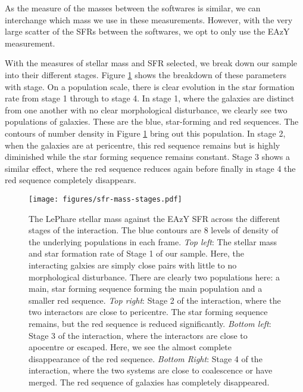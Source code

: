 \documentclass[fleqn,usenatbib]{mnras}
\begin{document}
As the measure of the masses between the softwares is similar, we can interchange which mass we use in these measurements. However, with the very large scatter of the SFRs between the softwares, we opt to only use the EAzY measurement. %

With the measures of stellar mass and SFR selected, we break down our sample into their different stages. Figure \ref{fig:sfr-mass} shows the breakdown of these parameters with stage. On a population scale, there is clear evolution in the star formation rate from stage 1 through to stage 4. In stage 1, where the galaxies are distinct from one another with no clear morphological disturbance, we clearly see two populations of galaxies. These are the blue, star-forming and red sequences. The contours of number density in Figure \ref{fig:sfr-mass} bring out this population. In stage 2, when the galaxies are at pericentre, this red sequence remains but is highly diminished while the star forming sequence remains constant. Stage 3 shows a similar effect, where the red sequence reduces again before finally in stage 4 the red sequence completely disappears.

\begin{figure}
    \centering
    \texttt{[image: figures/sfr-mass-stages.pdf]}
    \caption{The LePhare stellar mass against the EAzY SFR across the different stages of the interaction. The blue contours are 8 levels of density of the underlying populations in each frame. \textit{Top left}: The stellar mass and star formation rate of Stage 1 of our sample. Here, the interacting galxies are simply close pairs with little to no morphological disturbance. There are clearly two populations here: a main, star forming sequence forming the main population and a smaller red sequence. \textit{Top right}: Stage 2 of the interaction, where the two interactors are close to pericentre. The star forming sequence remains, but the red sequence is reduced significantly. \textit{Bottom left}: Stage 3 of the interaction, where the interactors are close to apocentre or escaped. Here, we see the almost complete disappearance of the red sequence. \textit{Bottom Right}: Stage 4 of the interaction, where the two systems are close to coalescence or have merged. The red sequence of galaxies has completely disappeared.}
    \label{fig:sfr-mass}
\end{figure}
\end{document}
